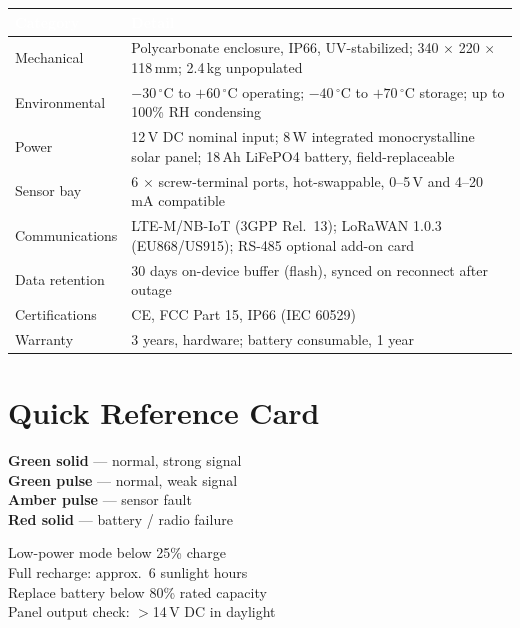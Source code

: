 \documentclass[11pt,a4paper,oneside,headings=big,chapterprefix=true]{scrreprt}
\begin{document}
\begin{center}
\renewcommand{\arraystretch}{1.25}
\begin{tabularx}{\textwidth}{@{}l X@{}}
\toprule
\rowcolor{steel}
\textcolor{white}{\bfseries Category} & \textcolor{white}{\bfseries Detail} \\
\midrule
Mechanical & Polycarbonate enclosure, IP66, UV-stabilized; 340 $\times$ 220 $\times$ 118\,mm; 2.4\,kg unpopulated \\
\rowcolor{fogbg}
Environmental & $-30\,^{\circ}\mathrm{C}$ to $+60\,^{\circ}\mathrm{C}$ operating; $-40\,^{\circ}\mathrm{C}$ to $+70\,^{\circ}\mathrm{C}$ storage; up to 100\% RH condensing \\
Power & 12\,V DC nominal input; 8\,W integrated monocrystalline solar panel; 18\,Ah LiFePO4 battery, field-replaceable \\
\rowcolor{fogbg}
Sensor bay & 6 $\times$ screw-terminal ports, hot-swappable, 0--5\,V and 4--20\,mA compatible \\
Communications & LTE-M/NB-IoT (3GPP Rel.\ 13); LoRaWAN 1.0.3 (EU868/US915); RS-485 optional add-on card \\
\rowcolor{fogbg}
Data retention & 30 days on-device buffer (flash), synced on reconnect after outage \\
Certifications & CE, FCC Part 15, IP66 (IEC 60529) \\
\rowcolor{fogbg}
Warranty & 3 years, hardware; battery consumable, 1 year \\
\bottomrule
\end{tabularx}
\end{center}

\chapter{Quick Reference Card}
\label{app:quickref}

\noindent
\begin{minipage}[t]{0.48\textwidth}
\begin{tcolorbox}[colback=steel!6,colframe=steel,title=\textcolor{white}{\bfseries\faSignal\ \ Status LED},fonttitle=\bfseries,arc=1.5pt]
\small
\textbf{Green solid} --- normal, strong signal\\
\textbf{Green pulse} --- normal, weak signal\\
\textbf{Amber pulse} --- sensor fault\\
\textbf{Red solid} --- battery / radio failure
\end{tcolorbox}
\end{minipage}\hfill
\begin{minipage}[t]{0.48\textwidth}
\begin{tcolorbox}[colback=amberaccent!8,colframe=amberaccent,title=\bfseries\faBatteryFull\ \ Power Notes,fonttitle=\bfseries,arc=1.5pt]
\small
Low-power mode below 25\% charge\\
Full recharge: approx.\ 6 sunlight hours\\
Replace battery below 80\% rated capacity\\
Panel output check: $>$14\,V DC in daylight
\end{tcolorbox}
\end{minipage}
\end{document}
